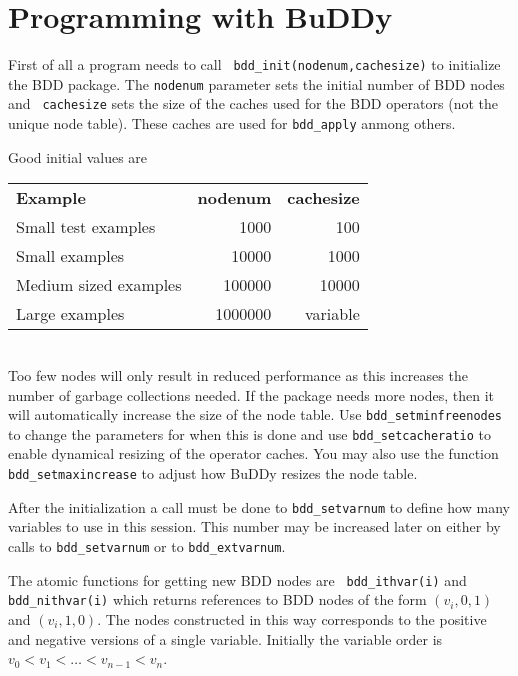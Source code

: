 \documentclass[a4paper,11pt,twoside,fleqn,openright]{report}
\begin{document}
\section{Programming with BuDDy} 

First of all a program needs to call {\tt
  bdd\_init(nodenum,cachesize)} to initialize the BDD package. The
{\tt nodenum} parameter sets the initial number of BDD nodes and {\tt
  cachesize} sets the size of the caches used for the BDD operators (not the
unique node table). These caches are used for {\tt bdd\_apply} anmong others.

Good initial values are
\\[\abovedisplayskip]

\begin{tabular}{lrr}
  {\bf Example} & {\bf nodenum} & {\bf cachesize} \\
  Small test examples & 1000 & 100 \\
  Small examples & 10000 & 1000 \\
  Medium sized examples & 100000 & 10000 \\
  Large examples & 1000000 & variable \\
\end{tabular}\\

\noindent
Too few nodes will only result in reduced performance as this
increases the number of garbage collections needed. If the package
needs more nodes, then it will automatically increase the size of the
node table.  Use {\tt bdd\_setminfreenodes} to change the parameters
for when this is done and use {\tt bdd\_setcacheratio} to enable
dynamical resizing of the operator caches. You may also use the
function {\tt bdd\_setmaxincrease} to adjust how BuDDy resizes the
node table.

After the initialization a call must be done to {\tt bdd\_setvarnum}
to define how many variables to use in this session. This number may
be increased later on either by calls to {\tt bdd\_setvarnum} or to
{\tt bdd\_extvarnum}.

The atomic functions for getting new BDD nodes are {\tt
  bdd\_ithvar(i)} and {\tt bdd\_nithvar(i)} which returns references
to BDD nodes of the form $(v_i,0,1)$ and $(v_i,1,0)$. The nodes
constructed in this way corresponds to the positive and negative
versions of a single variable.  Initially the variable order is $v_0 <
v_1 < \ldots < v_{n-1} < v_n$.
  
\end{document}
